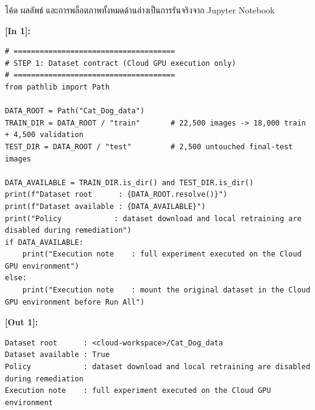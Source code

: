 \begin{tcolorbox}[colback=blue!5!white,colframe=blue!75!black,halign=left,before upper={\sloppy\raggedright},title=\textbf{Jupyter Notebook: CNN\_Homework.ipynb\\ (ไฟล์ส่งงานหลัก: 67\_1027\_1042.ipynb)}]
โค้ด ผลลัพธ์ และการพล็อตภาพทั้งหมดด้านล่างเป็นการรันจริงจาก Jupyter Notebook
\end{tcolorbox}

\vspace{0.6em}
\noindent\textbf{\small [In 1]:}
\begin{lstlisting}[style=pycode]
# =====================================
# STEP 1: Dataset contract (Cloud GPU execution only)
# =====================================
from pathlib import Path

DATA_ROOT = Path("Cat_Dog_data")
TRAIN_DIR = DATA_ROOT / "train"       # 22,500 images -> 18,000 train + 4,500 validation
TEST_DIR = DATA_ROOT / "test"         # 2,500 untouched final-test images

DATA_AVAILABLE = TRAIN_DIR.is_dir() and TEST_DIR.is_dir()
print(f"Dataset root      : {DATA_ROOT.resolve()}")
print(f"Dataset available : {DATA_AVAILABLE}")
print("Policy            : dataset download and local retraining are disabled during remediation")
if DATA_AVAILABLE:
    print("Execution note    : full experiment executed on the Cloud GPU environment")
else:
    print("Execution note    : mount the original dataset in the Cloud GPU environment before Run All")\end{lstlisting}
\noindent\textbf{\small [Out 1]:}
\begin{lstlisting}[style=output]
Dataset root      : <cloud-workspace>/Cat_Dog_data
Dataset available : True
Policy            : dataset download and local retraining are disabled during remediation
Execution note    : full experiment executed on the Cloud GPU environment
\end{lstlisting}


